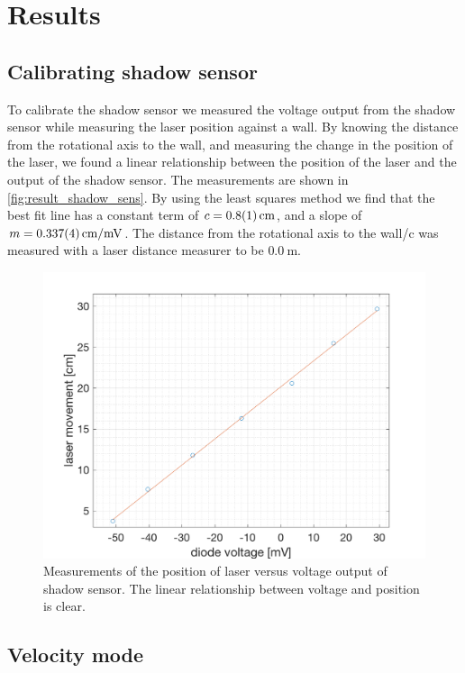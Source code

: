 \documentclass[english,a4paper,12pt,reprint]{revtex4-1}
\begin{document}
\section{Results}
\subsection{Calibrating shadow sensor}
To calibrate the shadow sensor we measured the voltage output from the shadow sensor while measuring the laser position against a wall. By knowing the distance from the rotational axis to the wall, and measuring the change in the position of the laser, we found a linear relationship between the position of the laser and the output of the shadow sensor. The measurements are shown in \vref{fig:result_shadow_sens}. By using the least squares method we find that the best fit line has a constant term of $c = \SI{0.8\pm0.1}{\centi\meter}$, and a slope of $m = \SI{0.337\pm0.004}{\centi\meter/\milli\volt}$. The distance from the rotational axis to the wall/c was measured with a laser distance measurer to be $\SI{0.0}{\meter}$.

\begin{figure}[htpb]
  \centering
  \includegraphics[scale=0.45]{laser_data.png}
  \caption{Measurements of the position of laser versus voltage output of shadow sensor. The linear relationship between voltage and position is clear.}
  \label{fig:result_shadow_sens}
\end{figure}

\subsection{Velocity mode}
\end{document}
